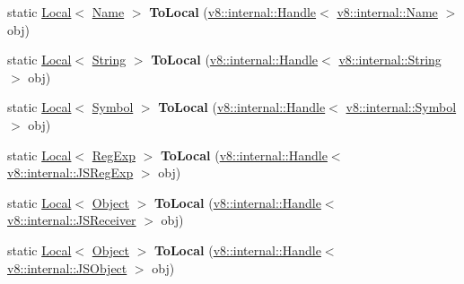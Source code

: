 \begin{DoxyCompactItemize}
\item 
\mbox{\label{classv8_1_1Utils_a0c902a0bb82752d5be5c426394b77c5c}} 
static \mbox{\hyperlink{classv8_1_1Local}{Local}}$<$ \mbox{\hyperlink{classv8_1_1Name}{Name}} $>$ {\bfseries To\+Local} (\mbox{\hyperlink{classv8_1_1internal_1_1Handle}{v8\+::internal\+::\+Handle}}$<$ \mbox{\hyperlink{classv8_1_1internal_1_1Name}{v8\+::internal\+::\+Name}} $>$ obj)
\item 
\mbox{\label{classv8_1_1Utils_a542c00f40ca2110234f8af6347c18226}} 
static \mbox{\hyperlink{classv8_1_1Local}{Local}}$<$ \mbox{\hyperlink{classv8_1_1String}{String}} $>$ {\bfseries To\+Local} (\mbox{\hyperlink{classv8_1_1internal_1_1Handle}{v8\+::internal\+::\+Handle}}$<$ \mbox{\hyperlink{classv8_1_1internal_1_1String}{v8\+::internal\+::\+String}} $>$ obj)
\item 
\mbox{\label{classv8_1_1Utils_a8f80a73e8cb52ce4ce60582f20066656}} 
static \mbox{\hyperlink{classv8_1_1Local}{Local}}$<$ \mbox{\hyperlink{classv8_1_1Symbol}{Symbol}} $>$ {\bfseries To\+Local} (\mbox{\hyperlink{classv8_1_1internal_1_1Handle}{v8\+::internal\+::\+Handle}}$<$ \mbox{\hyperlink{classv8_1_1internal_1_1Symbol}{v8\+::internal\+::\+Symbol}} $>$ obj)
\item 
\mbox{\label{classv8_1_1Utils_addc955f726ea1afd17380844f36d92c7}} 
static \mbox{\hyperlink{classv8_1_1Local}{Local}}$<$ \mbox{\hyperlink{classv8_1_1RegExp}{Reg\+Exp}} $>$ {\bfseries To\+Local} (\mbox{\hyperlink{classv8_1_1internal_1_1Handle}{v8\+::internal\+::\+Handle}}$<$ \mbox{\hyperlink{classv8_1_1internal_1_1JSRegExp}{v8\+::internal\+::\+J\+S\+Reg\+Exp}} $>$ obj)
\item 
\mbox{\label{classv8_1_1Utils_af30171d690a28bc7261257e417396198}} 
static \mbox{\hyperlink{classv8_1_1Local}{Local}}$<$ \mbox{\hyperlink{classv8_1_1Object}{Object}} $>$ {\bfseries To\+Local} (\mbox{\hyperlink{classv8_1_1internal_1_1Handle}{v8\+::internal\+::\+Handle}}$<$ \mbox{\hyperlink{classv8_1_1internal_1_1JSReceiver}{v8\+::internal\+::\+J\+S\+Receiver}} $>$ obj)
\item 
\mbox{\label{classv8_1_1Utils_a7e6956f478d4f7e0dce5986a422d1554}} 
static \mbox{\hyperlink{classv8_1_1Local}{Local}}$<$ \mbox{\hyperlink{classv8_1_1Object}{Object}} $>$ {\bfseries To\+Local} (\mbox{\hyperlink{classv8_1_1internal_1_1Handle}{v8\+::internal\+::\+Handle}}$<$ \mbox{\hyperlink{classv8_1_1internal_1_1JSObject}{v8\+::internal\+::\+J\+S\+Object}} $>$ obj)

\end{DoxyCompactItemize}
